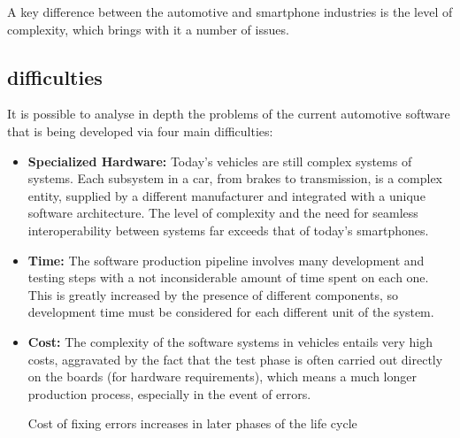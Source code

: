 A key difference between the automotive and smartphone industries is the level of complexity, which brings with it a number of issues.

\subsection{difficulties}
It is possible to analyse in depth the problems of the current automotive software that is being developed via four main difficulties:

\begin{itemize}
    \item \textbf{Specialized Hardware:} Today's vehicles are still complex systems of systems. Each subsystem in a car, from brakes to transmission, is a complex entity, supplied by a different manufacturer and integrated with a unique software architecture. The level of complexity and the need for seamless interoperability between systems far exceeds that of today's smartphones.
    \item \textbf{Time:} The software production pipeline involves many development and testing steps with a not inconsiderable amount of time spent on each one. This is greatly increased by the presence of different components, so development time must be considered for each different unit of the system.
    \item \textbf{Cost:} The complexity of the software systems in vehicles entails very high costs, aggravated by the fact that the test phase is often carried out directly on the boards (for hardware requirements), which means a much longer production process, especially in the event of errors.
    
    \begin{table}[h]
        \caption{Cost of fixing errors increases in later phases of the life cycle \cite{CostsOfSoftwareDeveloping}}
        \label{tab:CostsOfSoftwareDeveloping}
    \end{table}


\end{itemize}
